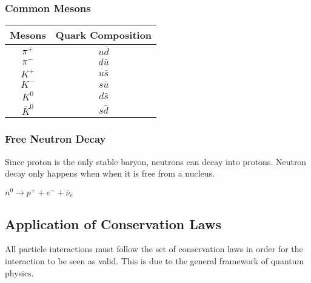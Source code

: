 \documentclass[10pt]{article}
\begin{document}
\begin{multicols}{2}
	\subsubsection{Common Mesons}
	\begin{center}
		\begin{tabular}{|c|c|}
			\hline
			Mesons      & Quark Composition \\
			\hline
			$\pi^+$     & $u\bar{d}$        \\
			$\pi^-$     & $d\bar{u}$        \\
			$K^+$       & $u\bar{s}$        \\
			$K^-$       & $s\bar{u}$        \\
			$K^0$       & $d\bar{s}$        \\
			$\bar{K}^0$ & $s\bar{d}$        \\
			\hline
		\end{tabular}
	\end{center}

	\subsubsection{Free Neutron Decay}
	Since proton is the only stable baryon, neutrons can decay into protons. Neutron
	decay only happens when when it is free from a nucleus.

	\begin{center}

		$n^0 \longrightarrow p^+ + e^- + \bar{\nu}_e$
	\end{center}

	\subsection{Application of Conservation Laws}
	All particle interactions must follow the set of conservation laws in order for
	the interaction to be seen as valid. This is due to the general framework of
	quantum physics.


\end{multicols}
\end{document}
